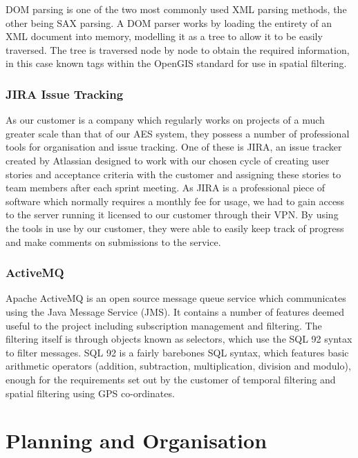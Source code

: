 \documentclass[a4paper, 12pt]{article}
\begin{document}
DOM parsing is one of the two most commonly used XML parsing methods, the other being SAX parsing. A DOM parser works by loading the entirety of an XML document into memory, modelling it as a tree to allow it to be easily traversed. The tree is traversed node by node to obtain the required information, in this case known tags within the OpenGIS standard for use in spatial filtering.

\subsubsection{JIRA Issue Tracking}

As our customer is a company which regularly works on projects of a much greater scale than that of our AES system, they possess a number of professional tools for organisation and issue tracking. One of these is JIRA, an issue tracker created by Atlassian designed to work with our chosen cycle of creating user stories and acceptance criteria with the customer and assigning these stories to team members after each sprint meeting. As JIRA is a professional piece of software which normally requires a monthly fee for usage, we had to gain access to the server running it licensed to our customer through their VPN. By using the tools in use by our customer, they were able to easily keep track of progress and make comments on submissions to the service.

\subsubsection{ActiveMQ}

Apache ActiveMQ is an open source message queue service which communicates using the Java Message Service (JMS). It contains a number of features deemed useful to the project including subscription management and filtering. The filtering itself is through objects known as selectors, which use the SQL 92 syntax to filter messages. SQL 92 is a fairly barebones SQL syntax, which features basic arithmetic operators (addition, subtraction, multiplication, division and modulo), enough for the requirements set out by the customer of temporal filtering and spatial filtering using GPS co-ordinates.

\newpage

\section{Planning and Organisation}
\label{sec:planning}
\end{document}

